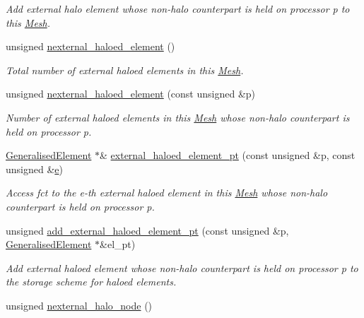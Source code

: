 \begin{DoxyCompactItemize}
\begin{DoxyCompactList}\small\item\em Add external halo element whose non-\/halo counterpart is held on processor p to this \hyperlink{classoomph_1_1Mesh}{Mesh}. \end{DoxyCompactList}\item 
unsigned \hyperlink{classoomph_1_1Mesh_a2ab617e7c2c754234dcad02d3d0ed5ba}{nexternal\+\_\+haloed\+\_\+element} ()
\begin{DoxyCompactList}\small\item\em Total number of external haloed elements in this \hyperlink{classoomph_1_1Mesh}{Mesh}. \end{DoxyCompactList}\item 
unsigned \hyperlink{classoomph_1_1Mesh_a32846269a1902f442314d6a711c64464}{nexternal\+\_\+haloed\+\_\+element} (const unsigned \&p)
\begin{DoxyCompactList}\small\item\em Number of external haloed elements in this \hyperlink{classoomph_1_1Mesh}{Mesh} whose non-\/halo counterpart is held on processor p. \end{DoxyCompactList}\item 
\hyperlink{classoomph_1_1GeneralisedElement}{Generalised\+Element} $\ast$\& \hyperlink{classoomph_1_1Mesh_a98da056d3db6f770e29d3739b6711eae}{external\+\_\+haloed\+\_\+element\+\_\+pt} (const unsigned \&p, const unsigned \&\hyperlink{cfortran_8h_a37cd013acc76697829c324bdd8562d82}{e})
\begin{DoxyCompactList}\small\item\em Access fct to the e-\/th external haloed element in this \hyperlink{classoomph_1_1Mesh}{Mesh} whose non-\/halo counterpart is held on processor p. \end{DoxyCompactList}\item 
unsigned \hyperlink{classoomph_1_1Mesh_a85fd3fc85e61062a50cdc56dec197449}{add\+\_\+external\+\_\+haloed\+\_\+element\+\_\+pt} (const unsigned \&p, \hyperlink{classoomph_1_1GeneralisedElement}{Generalised\+Element} $\ast$\&el\+\_\+pt)
\begin{DoxyCompactList}\small\item\em Add external haloed element whose non-\/halo counterpart is held on processor p to the storage scheme for haloed elements. \end{DoxyCompactList}\item 
unsigned \hyperlink{classoomph_1_1Mesh_a2dc1f87191771f18f55e9b44664bc7ea}{nexternal\+\_\+halo\+\_\+node} ()

\end{DoxyCompactItemize}
